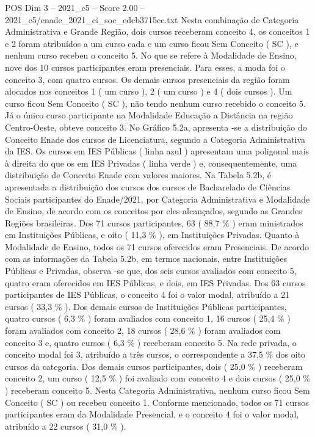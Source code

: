 \begin{textsample}{POS Dim 3 – 2021\_c5 – Score 2.00 – 2021\_c5/enade\_2021\_ci\_soc\_edcb3715cc.txt}
Nesta combinação de Categoria Administrativa e Grande Região, dois cursos receberam conceito 4, os conceitos 1 e 2 foram atribuídos a um curso cada e um curso ficou Sem Conceito ( SC ), e nenhum curso recebeu o conceito 5.
No que se refere à Modalidade de Ensino, nove dos 10 cursos participantes eram presenciais.
Para esses, a moda foi o conceito 3, com quatro cursos.
Os demais cursos presenciais da região foram alocados nos conceitos 1 ( um curso ), 2 ( um curso ) e 4 ( dois cursos ).
Um curso ficou Sem Conceito ( SC ), não tendo nenhum curso recebido o conceito 5.
Já o único curso participante na Modalidade Educação a Distância na região Centro-Oeste, obteve conceito 3.
No Gráfico 5.2a, apresenta -se a distribuição do Conceito Enade dos cursos de Licenciatura, segundo a Categoria Administrativa da IES.
Os cursos em IES Públicas ( linha azul ) apresentam uma poligonal mais à direita do que os em IES Privadas ( linha verde ) e, consequentemente, uma distribuição de Conceito Enade com valores maiores.
Na Tabela 5.2b, é apresentada a distribuição dos cursos dos cursos de Bacharelado de Ciências Sociais participantes do Enade/2021, por Categoria Administrativa e Modalidade de Ensino, de acordo com os conceitos por eles alcançados, segundo as Grandes Regiões brasileiras.
Dos 71 cursos participantes, 63 ( 88,7 \% ) eram ministrados em Instituições Públicas, e oito ( 11,3 \% ), em Instituições Privadas.
Quanto à Modalidade de Ensino, todos os 71 cursos oferecidos eram Presenciais.
De acordo com as informações da Tabela 5.2b, em termos nacionais, entre Instituições Públicas e Privadas, observa -se que, dos seis cursos avaliados com conceito 5, quatro eram oferecidos em IES Públicas, e dois, em IES Privadas.
Dos 63 cursos participantes de IES Públicas, o conceito 4 foi o valor modal, atribuído a 21 cursos ( 33,3 \% ).
Dos demais cursos de Instituições Públicas participantes, quatro cursos ( 6,3 \% ) foram avaliados com conceito 1, 16 cursos ( 25,4 \% ) foram avaliados com conceito 2, 18 cursos ( 28,6 \% ) foram avaliados com conceito 3 e, quatro cursos ( 6,3 \% ) receberam conceito 5.
Na rede privada, o conceito modal foi 3, atribuído a três cursos, o correspondente a 37,5 \% dos oito cursos da categoria.
Dos demais cursos participantes, dois ( 25,0 \% ) receberam conceito 2, um curso ( 12,5 \% ) foi avaliado com conceito 4 e dois cursos ( 25,0 \% ) receberam conceito 5.
Nesta Categoria Administrativa, nenhum curso ficou Sem Conceito ( SC ) ou recebeu conceito 1.
Conforme mencionado, todos os 71 cursos participantes eram da Modalidade Presencial, e o conceito 4 foi o valor modal, atribuído a 22 cursos ( 31,0 \% ).

\end{textsample}
